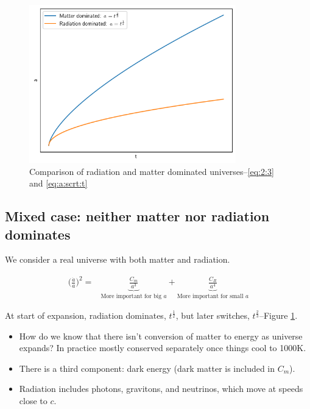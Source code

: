 \documentclass[]{article}
\begin{document}
\begin{figure}[H]
	\caption[Comparison of radiation and matter dominated universes]{Comparison of radiation and matter dominated universes--\eqref{eq:2:3} and \eqref{eq:a:scrt:t}}\label{fig:cosmo-2-a-r}
	\begin{center}
			\includegraphics[width=0.8\textwidth]{cosmo-2-a-r}
	\end{center}
\end{figure}


\subsection{Mixed case: neither matter nor radiation dominates}

We consider a real universe with both matter and radiation.

\begin{align*}
	\big(\frac{\dot{a}}{a}\big)^2 =& \underbrace{\frac{C_m}{a^3}}_\text{More important for big $a$} + \underbrace{\frac{C_R}{a^4}}_\text{More important for small $a$}
\end{align*}

At start of expansion, radiation dominates, $t^{\frac{1}{2}}$, but later switches, $t^{\frac{2}{3}}$--Figure \ref{fig:cosmo-2-a-r}.

\begin{itemize}
	\item How do we know that there isn't conversion of matter to energy as universe expands? In practice mostly conserved separately once things cool to 1000K.

	\item There is a third component: dark energy (dark matter is included in $C_m$).

	\item Radiation includes photons, gravitons, and neutrinos, which move at speeds close to $c$.
\end{itemize}
\end{document}
